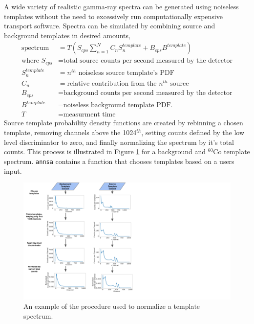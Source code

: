 A wide variety of realistic gamma-ray spectra can be generated using noiseless templates without the need to excessively run computationally expensive transport software. Spectra can be simulated by combining source and background templates in desired amounts,
%
\begin{align}
\text{spectrum} &= T ( S_{cps} \sum_{n=1}^{N} C_n S_{n}^{template}  + B_{cps} B^{template} ) \\
\text{where } S_{cps} &= \text{total source counts per second measured by the detector} \nonumber \\
S_{n}^{template} &= n^{th} \text{ noiseless source template's PDF} \nonumber \\
C_{n} &= \text{relative contribution from the $n^{th}$ source} \nonumber \\
B_{cps} &= \text{background counts per second measured by the detector} \nonumber \\
B^{template} &= \text{noiseless background template PDF.} \nonumber \\
T &= \text{measurment time}
\end{align}
%
Source template probability density functions are created by rebinning a chosen template, removing channels above the 1024$^{th}$, setting counts defined by the low level discriminator to zero, and finally normalizing the spectrum by it's total counts. This process is illustrated in Figure \ref{fig:template_manipulation} for a background and $^{60}$Co template spectrum. \verb|annsa| contains a function that chooses templates based on a users input.

\begin{figure}[H]
	\centering
	\includegraphics[trim=0 0 450 0,clip,width=1.0\linewidth]{images/template_manipulation.png}
	\caption{An example of the procedure used to normalize a template spectrum.}
	\label{fig:template_manipulation}
\end{figure}

